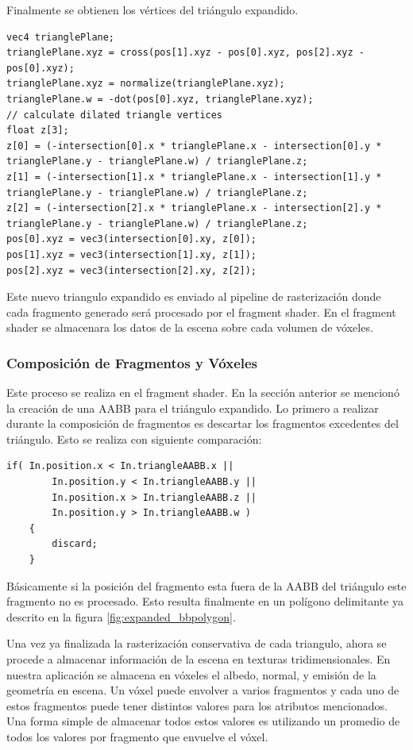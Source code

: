 Finalmente se obtienen los vértices del triángulo expandido.
\\
\begin{lstlisting}[caption={Vértices del triángulo expandido.}, label=TPlanes3]
vec4 trianglePlane;
trianglePlane.xyz = cross(pos[1].xyz - pos[0].xyz, pos[2].xyz - pos[0].xyz);
trianglePlane.xyz = normalize(trianglePlane.xyz);
trianglePlane.w = -dot(pos[0].xyz, trianglePlane.xyz);
// calculate dilated triangle vertices
float z[3];
z[0] = (-intersection[0].x * trianglePlane.x - intersection[0].y * trianglePlane.y - trianglePlane.w) / trianglePlane.z;
z[1] = (-intersection[1].x * trianglePlane.x - intersection[1].y * trianglePlane.y - trianglePlane.w) / trianglePlane.z;
z[2] = (-intersection[2].x * trianglePlane.x - intersection[2].y * trianglePlane.y - trianglePlane.w) / trianglePlane.z;
pos[0].xyz = vec3(intersection[0].xy, z[0]);
pos[1].xyz = vec3(intersection[1].xy, z[1]);
pos[2].xyz = vec3(intersection[2].xy, z[2]);
\end{lstlisting}

Este nuevo triangulo expandido es enviado al pipeline de rasterización donde cada fragmento generado será procesado por el fragment shader. En el fragment shader se almacenara los datos de la escena sobre cada volumen de vóxeles.

\subsubsection{Composición de Fragmentos y Vóxeles}

Este proceso se realiza en el fragment shader. En la sección anterior se mencionó la creación de una \ac{AABB} para el triángulo expandido. Lo primero a realizar durante la composición de fragmentos es descartar los fragmentos excedentes del triángulo. Esto se realiza con siguiente comparación:
\\
\begin{lstlisting}[caption={Descarte de fragmentos excedentes en el fragment shader.}, label=TPlanes4]
    if( In.position.x < In.triangleAABB.x || 
    	In.position.y < In.triangleAABB.y || 
		In.position.x > In.triangleAABB.z || 
		In.position.y > In.triangleAABB.w )
	{
		discard;
	}
\end{lstlisting}
Básicamente si la posición del fragmento esta fuera de la \ac{AABB} del triángulo este fragmento no es procesado. Esto resulta finalmente en un polígono delimitante ya descrito en la figura \ref{fig:expanded_bbpolygon}.

Una vez ya finalizada la rasterización conservativa de cada triangulo, ahora se procede a almacenar información de la escena en texturas tridimensionales.  En nuestra aplicación se almacena en vóxeles el albedo, normal, y emisión de la geometría en escena. Un vóxel puede envolver a varios fragmentos y cada uno de estos fragmentos puede tener distintos valores para los atributos mencionados. Una forma simple de almacenar todos estos valores es utilizando un promedio de todos los valores por fragmento que envuelve el vóxel. 

